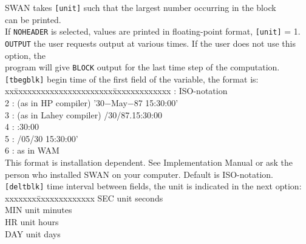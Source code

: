 \documentclass[12pt]{book}
\begin{document}
\begin{tabbing}
                SWAN takes {\tt [unit]} such that the largest number occurring in the block\\
                can be printed.\\
                If {\tt NOHEADER} is selected, values are printed in floating-point format, {\tt [unit]} = 1.\-\\
{\tt OUTPUT} \> the user requests output at various times. If the user does not use this option, the\+\\
                program will give {\tt BLOCK} output for the last time step of the computation.\-\\
{\tt [tbegblk]}     \> begin time of the first field of the variable, the format is:\+\\
                       \pushtabs
                       xx\=xxxxxxxxxxxxxxxxxxxxxx\=xxxxxxxxxxxxx  \>: ISO-notation                     \\
                       2 \>: (as in HP compiler)    \> '30$-$May$-$87 15:30:00' \\
                       3 \>: (as in Lahey compiler) /30/87.15:30:00        \\
                       4 \>:                        :30:00                 \\
                       5 \>:                        /05/30 15:30:00'       \\
                       6 \>: as in WAM                             \\
                       \poptabs
                       This format is installation dependent. See Implementation Manual or ask the\\
                       person who installed SWAN on your computer. Default is ISO-notation.\-\\
{\tt [deltblk]}     \> time interval between fields, the unit is indicated in the next option:\+\\
                       \pushtabs
                       xxxxxxx\=xxxxxxxxxxxxx \kill
                       SEC \> unit seconds\\
                       MIN \> unit minutes\\
                       HR  \> unit hours\\
                       DAY \> unit days\-\\
                       \poptabs
\end{tabbing}
\end{document}
